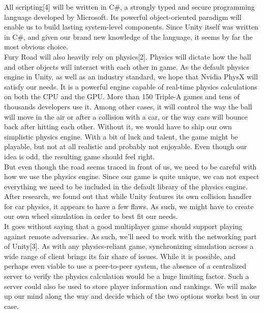 All scripting[4] will be written in C\#, a strongly typed and secure programming language developed by Microsoft. Its powerful object-oriented paradigm will enable us to build lasting system-level components. Since Unity itself was written in C\#, and given our brand new knowledge of the language, it seems by far the most obvious choice.\\

Fury Road will also heavily rely on physics[2]. Physics will dictate how the ball and other objects will interact with each other in game. As the default physics engine in Unity, as well as an industry standard, we hope that Nvidia PhysX will satisfy our needs. It is a powerful engine capable of real-time physics calculations on both the CPU and the GPU. More than 150 Triple-A games and tens of thousands developers use it. Among other cases, it will control the way the ball will move in the air or after a collision with a car, or the way cars will bounce back after hitting each other. Without it, we would have to ship our own simplistic physics engine. With a bit of luck and talent, the game might be playable, but not at all realistic and probably not enjoyable. Even though our idea is odd, the resulting game should feel right.\\

But even though the road seems traced in front of us, we need to be careful with how we use the physics engine. Since our game is quite unique, we can not expect everything we need to be included in the default library of the physics engine. After research, we found out that while Unity features its own collision handler for car physics, it appears to have a few flaws. As such, we might have to create our own wheel simulation in order to best fit our needs.\\

It goes without saying that a good multiplayer game should support playing against remote adversaries. As such, we’ll need to work with the networking part of Unity[3]. As with any physics-reliant game, synchronizing simulation across a wide range of client brings its fair share of issues. While it is possible, and perhaps even viable to use a peer-to-peer system, the absence of a centralized server to verify the physics calculation would be a huge limiting factor. Such a server could also be used to store player information and rankings. We will make up our mind along the way and decide which of the two options works best in our case.\\

